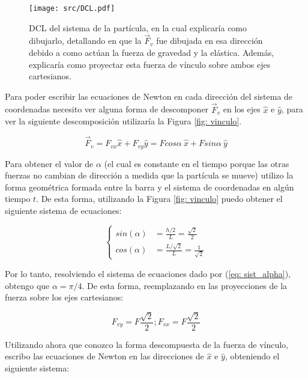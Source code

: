 \documentclass{article}
\begin{document}
\begin{multicols}{2}
\begin{figure}[H]
    \centering
    \texttt{[image: src/DCL.pdf]}
    \caption{
        DCL del sistema de la partícula, en la cual explicaría como dibujarlo, detallando en que la $\vec{F}_v$ fue dibujada en esa dirección debido a como actúan la fuerza de gravedad y la elástica. Además, explicaría como proyectar esta fuerza de vínculo sobre ambos ejes cartesianos.
    }
    \label{fig: DCL}
\end{figure}

Para poder escribir las ecuaciones de Newton en cada dirección del sistema de coordenadas necesito ver alguna forma de descomponer $\vec{F}_v$ en los ejes $\hat{x}$ e $\hat{y}$, para ver la siguiente descomposición utilizaría la Figura \ref{fig: vinculo}.

\begin{equation}
    \vec{F}_v = F_{vx} \hat{x} + F_{vy} \hat{y} = Fcos\alpha \ \hat{x} + Fsin\alpha \ \hat{y}
\end{equation}

Para obtener el valor de $\alpha$ (el cual es constante en el tiempo porque las otras fuerzas no cambian de dirección a medida que la partícula se mueve) utilizo la forma geométrica formada entre la barra y el sistema de coordenadas en algún tiempo $t$. De esta forma, utilizando la Figura \ref{fig: vinculo} puedo obtener el siguiente sistema de ecuaciones:

\begin{equation}
\begin{cases}
    sin(\alpha) &= \frac{h/2}{L} = \frac{\sqrt{2}}{2} \\
    cos(\alpha) &= \frac{L/\sqrt{2}}{L} = \frac{1}{\sqrt{2}}
    \label{eq: sist_alpha}
\end{cases}
\end{equation}

Por lo tanto, resolviendo el sistema de ecuaciones dado por (\ref{eq: sist_alpha}), obtengo que $\alpha = \pi/4$. De esta forma, reemplazando en las proyecciones de la fuerza sobre los ejes cartesianos:

\begin{equation}
    F_{vy} = F \frac{\sqrt{2}}{2}; F_{vx} = F \frac{\sqrt{2}}{2}
\end{equation}

Utilizando ahora que conozco la forma descompuesta de la fuerza de vínculo, escribo las ecuaciones de Newton en las direcciones de $\hat{x}$ e $\hat{y}$, obteniendo el siguiente sistema:


\end{multicols}
\end{document}
